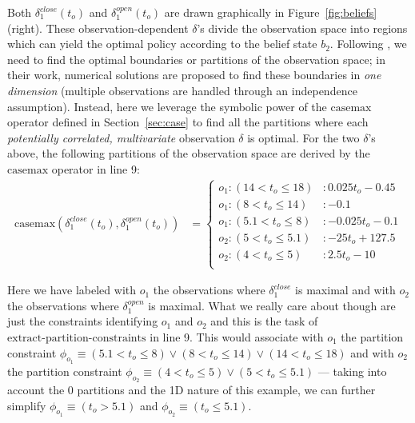 \documentclass{article} %
\newcommand{\open}{\mathit{open}}
\newcommand{\close}{\mathit{close}}
\newcommand{\casemax}{\mathrm{casemax}}
\begin{document}
Both $\delta^{\close}_1(t_o)$ and $\delta^{\open}_1(t_o)$ are drawn
graphically in Figure~\ref{fig:beliefs} (right).  These observation-dependent 
$\delta$'s divide the observation space into regions
which can yield the optimal policy according to the belief state
$b_2$.  Following \cite{pascal_ijcai05}, we need to find the optimal
boundaries or partitions of the observation space; in their work, numerical
solutions are proposed to find these boundaries in \emph{one dimension}
(multiple observations are handled through an independence assumption).
Instead, here we leverage the symbolic power of
the $\casemax$ operator defined in Section~\ref{sec:case} to find all the
partitions where each \emph{potentially correlated, multivariate} observation
$\delta$ is optimal. For the two $\delta$'s 
above, the following partitions of the observation space are derived
by the $\casemax$ operator in line 9:
{\footnotesize
\vspace{-1mm}
\begin{align}
\casemax \left( \delta^{\close}_1(t_o),\delta^{\open}_1(t_o) \right) &= 
\begin{cases}
o_1: (14 < t_o \leq 18) &: 0.025 t_o - 0.45\\
o_1: (8 < t_o \leq 14) &:  -0.1\\
o_1: (5.1 < t_o \leq  8) &: - 0.025 t_o -0.1\\
o_2: (5 < t_o \leq 5.1) &: - 25 t_o + 127.5\\
o_2: (4 < t_o \leq  5) &:  2.5 t_o - 10\\
\end{cases}
\nonumber
\end{align}
\vspace{-4mm}
}

Here we have labeled with $o_1$ the observations where 
$\delta^\close_1$ is maximal and with $o_2$ the observations where
$\delta^\open_1$ is maximal.
What we really care about though are just the constraints 
identifying $o_1$ and $o_2$ and this is the
task of $\mathrm{extract\text{-}partition\text{-}constraints}$ in line 9.
This would associate with $o_1$ the partition constraint
$\phi_{o_1} \equiv (5.1 < t_o \leq 8) \lor (8 < t_o \leq 14) \lor (14 < t_o \leq 18)$
and with $o_2$ the 
partition constraint $\phi_{o_2} \equiv (4 < t_o \leq 5) \lor (5 < t_o \leq 5.1)$
--- taking into account the 0 partitions and the 1D nature of this example, 
we can further simplify
$\phi_{o_1} \equiv (t_o > 5.1)$ and $\phi_{o_2} \equiv (t_o \leq 5.1)$.
\end{document}
